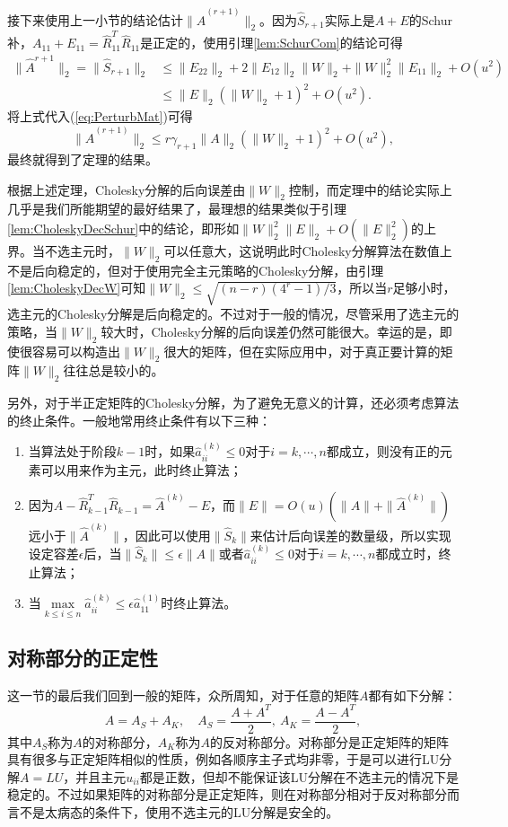 \documentclass[a4paper,10pt]{ctexart}
\begin{document}
接下来使用上一小节的结论估计$ \| \hat{A}^{(r+1)} \|_2 $。因为$ \hat{S}_{r+1} $实际上是$ A+E $的Schur补，$ A_{11}+E_{11} = \hat{R}_{11}^T \hat{R}_{11} $是正定的，使用引理\ref{lem:SchurCom}的结论可得
\[
    \begin{aligned}
        \| \hat{A}^{r+1} \|_2 = \| \hat{S}_{r+1} \|_2 &\leqslant \| E_{22} \|_2 + 2\| E_{12} \|_2 \| W \|_2 + \| W \|_2^2 \| E_{11} \|_2 + O(u^2)\\
        &\leqslant \| E \|_2( \| W \|_2 + 1)^2 + O(u^2).
    \end{aligned}
\]
将上式代入(\ref{eq:PerturbMat})可得
\[
    \| \hat{A}^{(r+1)} \|_2 \leqslant r \gamma_{r+1} \| A \|_2 (\| W \|_2+1)^2 + O(u^2),
\]
最终就得到了定理的结果。

根据上述定理，Cholesky分解的后向误差由$ \| W \|_2 $控制，而定理中的结论实际上几乎是我们所能期望的最好结果了，最理想的结果类似于引理\ref{lem:CholeskyDecSchur}中的结论，即形如$ \| W \|_2^2 \| E \|_2 + O(\| E \|_2^2) $的上界。当不选主元时，$ \| W \|_2 $可以任意大，这说明此时Cholesky分解算法在数值上不是后向稳定的，但对于使用完全主元策略的Cholesky分解，由引理\ref{lem:CholeskyDecW}可知$ \| W \|_2\leqslant \sqrt{(n-r)(4^r-1) / 3} $，所以当$ r $足够小时，选主元的Cholesky分解是后向稳定的。不过对于一般的情况，尽管采用了选主元的策略，当$ \| W \|_2 $较大时，Cholesky分解的后向误差仍然可能很大。幸运的是，即使很容易可以构造出$ \| W \|_2 $很大的矩阵，但在实际应用中，对于真正要计算的矩阵$ \| W \|_2 $往往总是较小的。

另外，对于半正定矩阵的Cholesky分解，为了避免无意义的计算，还必须考虑算法的终止条件。一般地常用终止条件有以下三种：
\begin{enumerate}
    \item 当算法处于阶段$ k-1 $时，如果$ \hat{a}_{ii}^{(k)}\leqslant 0 $对于$ i=k,\cdots ,n $都成立，则没有正的元素可以用来作为主元，此时终止算法；
    \item 因为$ A-\hat{R}_{k-1}^T \hat{R}_{k-1} = \hat{A}^{(k)}-E $，而$ \| E \| = O(u)(\| A \| + \| \hat{A}^{(k)} \|) $远小于$ \| \hat{A}^{(k)} \| $，因此可以使用$ \| \hat{S}_k \| $来估计后向误差的数量级，所以实现设定容差$ \epsilon $后，当$ \| \hat{S}_k \| \leqslant \epsilon \| A \| $或者$ \hat{a}_{ii}^{(k)}\leqslant 0 $对于$ i=k,\cdots ,n $都成立时，终止算法；
    \item 当$ \max\limits_{k\leqslant i\leqslant n}\hat{a}_{ii}^{(k)} \leqslant \epsilon \hat{a}_{11}^{(1)} $时终止算法。
\end{enumerate}

\subsection{对称部分的正定性}
这一节的最后我们回到一般的矩阵，众所周知，对于任意的矩阵$ A $都有如下分解：
\begin{equation}
    A = A_S + A_K,\quad A_S = \frac{A+A^T}{2},\ A_K = \frac{A-A^T}{2},
\end{equation}
其中$ A_S $称为$ A $的对称部分，$ A_K $称为$ A $的反对称部分。对称部分是正定矩阵的矩阵具有很多与正定矩阵相似的性质，例如各顺序主子式均非零，于是可以进行LU分解$ A=LU $，并且主元$ u_{ii} $都是正数，但却不能保证该LU分解在不选主元的情况下是稳定的。不过如果矩阵的对称部分是正定矩阵，则在对称部分相对于反对称部分而言不是太病态的条件下，使用不选主元的LU分解是安全的。
\end{document}

